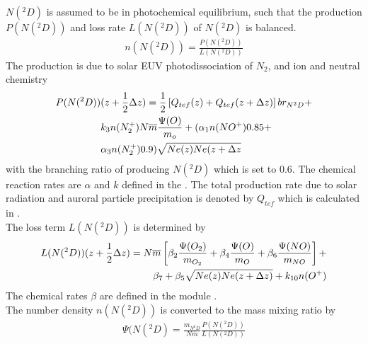 %
$N(^2D)$ is assumed to be in photochemical equilibrium, such that
the production $P(N(^2D))$ and loss rate $L(N(^2D))$ of $N(^2D)$ is
balanced.
%
\begin{align}
  n(N(^2D)) = \frac{P(N(^2D))}{L(N(^2D))}
\end{align}
%
The production is due to solar EUV photodissociation of $N_2$, and
ion and neutral chemistry
%
\begin{align}
 P(N(^2D))&(z+\frac{1}{2}\Delta z) = \frac{1}{2} \left[ Q_{tef}(z) +  Q_{tef}(z+\Delta z)\right]
   br_{N^2D} + \notag \\
   & k_3 n(N_2^+)N \overline{m}\frac{\Psi(O)}{m_o} +
   ( \alpha_1 n(NO^+) 0.85 + \notag \\
   & \alpha_3 n(N_2^+) 0.9 )
   \sqrt{Ne(z) Ne(z+\Delta z}
\end{align}
%
with the branching ratio of producing $N(^2D)$ which is set to 0.6.
The chemical reaction rates are $\alpha$ and $k$ defined in the
. The total production rate due to solar
radiation and auroral particle precipitation is denoted by $Q_{tef}$
which is calculated in . \\
The loss term $L(N(^2D))$ is determined by
%
\begin{align}
  L(N(^2D))(z+\frac{1}{2}\Delta z) = N\overline{m} \left[ \beta_2 \frac{\Psi(O_2)}{m_{O_2}} +
     \beta_4 \frac{\Psi(O)}{m_{O}} +  \beta_6
     \frac{\Psi(NO)}{m_{NO}}\right]+ \notag \\
     \; \; \; \beta_7 + \beta_5\sqrt{Ne(z) Ne(z+\Delta z)} + k_{10}n(O^+)
\end{align}
%
The chemical rates $\beta$ are defined in the module
. \\
The number density $n(N(^2D))$ is converted to the mass mixing ratio
by
%
\begin{align}
  \Psi(N(^2D) = \frac{m_{N^2D}}{N \overline{m}}\frac{P(N(^2D))}{L(N(^2D))}
\end{align}
%
